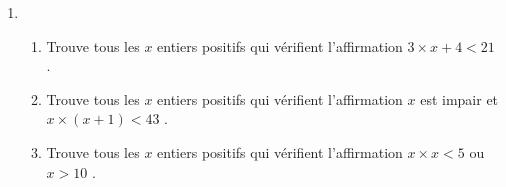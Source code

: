 \documentclass[class=report,crop=false, 12pt]{standalone}
\begin{document}
\begin{activite}
\begin{enumerate}
  \item

  \begin{enumerate}
    \item Trouve tous les $x$ entiers positifs qui vérifient l'affirmation \og $3 \times x + 4 < 21$ \fg{}.
    \item Trouve tous les $x$ entiers positifs qui vérifient  l'affirmation \og $x$ est impair et $x\times(x+1) < 43$ \fg{}.
    \item Trouve tous les $x$ entiers positifs qui vérifient l'affirmation \og $x \times x < 5$ ou $x >10$ \fg{}.
  \end{enumerate} 
   
\end{enumerate}


\end{activite}
\end{document}
